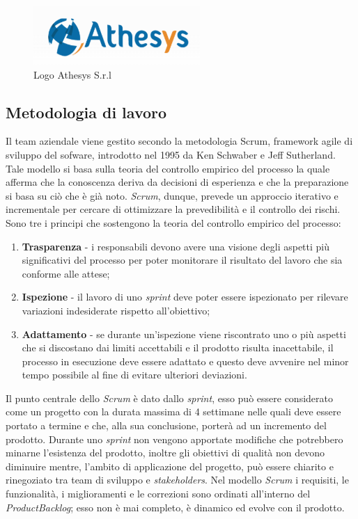 \begin{figure}[!h]
	\centering
	\includegraphics{immagini/logo_athesys}
	\caption{Logo Athesys S.r.l}
\end{figure}

\subsection{Metodologia di lavoro}
Il team aziendale viene gestito secondo la metodologia \gls{Scrum}, framework \gls{agile} di sviluppo del sofware, introdotto nel 1995 da Ken Schwaber e Jeff Sutherland. Tale modello si basa sulla teoria del controllo empirico del processo la quale afferma che la conoscenza deriva da decisioni di esperienza e che la preparazione si basa su ciò che è già noto. \textit{Scrum}, dunque, prevede un approccio iterativo e incrementale per cercare di ottimizzare la prevedibilità e il controllo dei rischi. Sono tre i principi che sostengono la teoria del controllo empirico del processo:
\begin{enumerate}
	\item \textbf{Trasparenza} - i responsabili devono avere una visione degli aspetti più significativi del processo per poter monitorare il risultato del lavoro che sia conforme alle attese;
	\item \textbf{Ispezione} - il lavoro di uno \textit{sprint} deve poter essere ispezionato per rilevare variazioni indesiderate rispetto all'obiettivo;
	\item \textbf{Adattamento} - se durante un'ispezione viene riscontrato uno o più aspetti che si discostano dai limiti accettabili e il prodotto risulta inacettabile, il processo in esecuzione deve essere adattato e questo deve avvenire nel minor tempo possibile al fine di evitare ulteriori deviazioni.
\end{enumerate}
Il punto centrale dello \textit{Scrum} è dato dallo \textit{sprint}, esso può essere considerato come un progetto con la durata massima di 4 settimane nelle quali deve essere portato a termine e che, alla sua conclusione, porterà ad un incremento del prodotto. Durante uno \textit{sprint} non vengono apportate modifiche che potrebbero minarne l'esistenza del prodotto, inoltre gli obiettivi di qualità non devono diminuire mentre, l'ambito di applicazione del progetto, può essere chiarito e rinegoziato tra team di sviluppo e \textit{stakeholders}. Nel modello \textit{Scrum} i requisiti, le funzionalità, i miglioramenti e le correzioni sono ordinati all'interno del \emph{\gls{ProductBacklog}}\glsfirstoccur; esso non è mai completo, è dinamico ed evolve con il prodotto.\\
